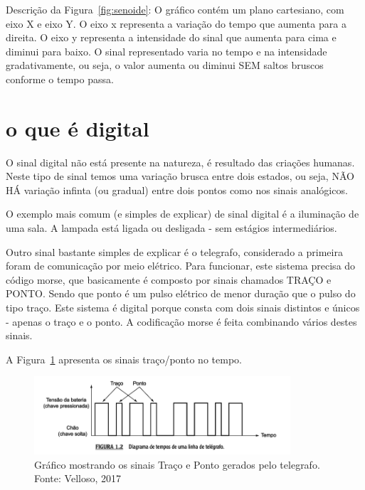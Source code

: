 Descrição da Figura~\ref{fig:senoide}:  O gráfico contém um plano cartesiano, com eixo X e eixo Y. O eixo x representa a variação do tempo que aumenta para a direita. O eixo y representa a intensidade do sinal que aumenta para cima e diminui para baixo. O sinal representado varia no tempo e na intensidade gradativamente, ou seja, o valor aumenta ou diminui SEM saltos bruscos conforme o tempo passa.


\section{o que é digital}
\label{sinalDigital}

O sinal digital não está presente na natureza, é resultado das criações humanas. Neste tipo de sinal temos uma variação brusca entre dois estados, ou seja, NÃO HÁ variação infinta (ou gradual) entre dois pontos como nos sinais analógicos. 

O exemplo mais comum (e simples de explicar) de sinal digital é a iluminação de uma sala. A lampada está ligada ou desligada - sem estágios intermediários.

Outro sinal bastante simples de explicar é o telegrafo, considerado a primeira foram de comunicação por meio elétrico. Para funcionar, este sistema precisa do código morse, que basicamente é composto por sinais chamados TRAÇO e PONTO. Sendo que ponto é um pulso elétrico de menor duração que o pulso do tipo traço. Este sistema é digital porque consta com dois sinais distintos e únicos - apenas o traço e o ponto. A codificação morse é feita combinando vários destes sinais. 

A Figura~\ref{fig:telegrafo} apresenta os sinais traço/ponto no tempo.

\begin{figure}[h]
	\begin{center}
		\includegraphics[width=0.85\textwidth]{img/sinais/telegrafo.png}
		\caption{Gráfico mostrando os sinais Traço e Ponto gerados pelo telegrafo. Fonte: Velloso, 2017}
		\label{fig:telegrafo}
	\end{center}
\end{figure}

